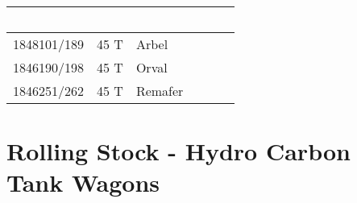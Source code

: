 \begin{supertabular}{|m{6.432cm}|m{1.578cm}|m{3.9279997cm}|m{0.573cm}|m{0.86700004cm}|m{2.164cm}|}
{\bfseries\color{black} ~} &
{\bfseries\color{black} ~} &
\centering{\bfseries\color{black} ~} &
 &
\raggedleft\arraybslash{\bfseries\color{black} ~}\\\hline
{\color{black} 1848101/189} &
{\color{black} 45 T} &
{\color{black} Arbel} &
 &
~
 &
\raggedleft{}\\\hline
{\color{black} 1846190/198} &
{\color{black} 45 T} &
{\color{black} Orval} &
 &
~
 &
\raggedleft{}\\\hline
{\color{black} 1846251/262} &
{\color{black} 45 T} &
{\color{black} Remafer} &
 &
~
 &
\raggedleft{}\\\hline

\end{supertabular}



\section{Rolling Stock - Hydro Carbon Tank  Wagons}

